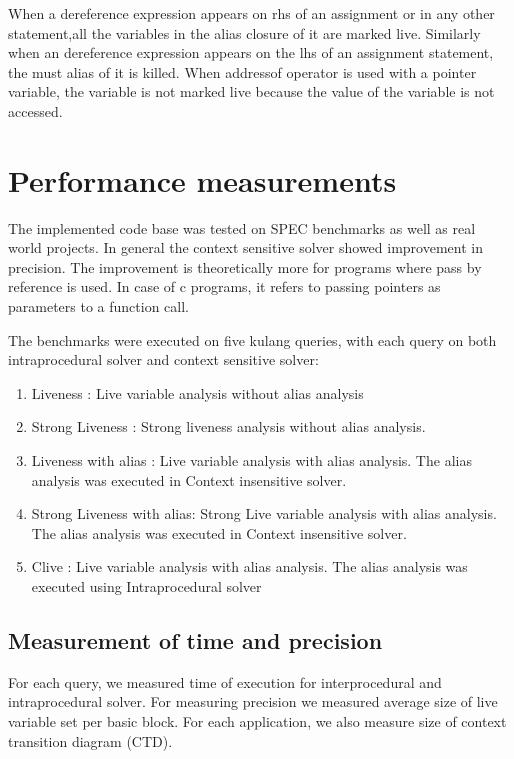 \documentclass[12pt]{report}
\begin{document}
When a dereference expression appears on rhs of an assignment or in any other statement,all the variables in the alias closure of it are marked live. Similarly when an dereference expression appears on the lhs of an assignment statement, the must alias of it is killed. When addressof operator is used with a pointer variable, the variable is not marked live because the value of the variable is not accessed.



\newpage
\chapter{Performance measurements}

The implemented code base was tested on SPEC benchmarks as well as real world projects. In general the context sensitive solver showed improvement in precision. The improvement is theoretically more for programs where pass by reference is used. In case of c programs, it refers to passing pointers as parameters to a function call.

The benchmarks were executed on five kulang queries, with each query on both intraprocedural solver and context sensitive solver:

\begin{enumerate}
\item Liveness : Live variable analysis without alias analysis
\item Strong Liveness : Strong liveness analysis without alias analysis.
\item Liveness with alias : Live variable analysis with alias analysis. The alias analysis was executed in Context insensitive solver.
\item Strong Liveness with alias: Strong Live variable analysis with alias analysis. The alias analysis was executed in Context insensitive solver.
\item Clive : Live variable analysis with alias analysis. The alias analysis was executed using Intraprocedural solver

\end{enumerate}

\section{Measurement of time and precision}
For each query, we measured time of execution for interprocedural and intraprocedural solver. For measuring precision we measured average size of live variable set per basic block. For each application, we also measure size of context transition diagram (CTD).
\end{document}

